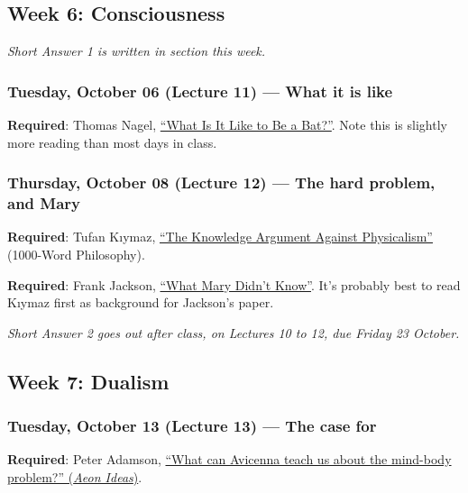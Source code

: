\documentclass[
  letterpaper,
  DIV=11,
  numbers=noendperiod]{scrartcl}
\begin{document}
\subsection{Week 6: Consciousness}\label{week-6-consciousness}

\emph{Short Answer 1 is written in section this week.}

\subsubsection{Tuesday, October 06 (Lecture 11) --- What it is
like}\label{tuesday-october-06-lecture-11-what-it-is-like}

\textbf{Required}: Thomas Nagel,
\href{https://rintintin.colorado.edu/~vancecd/phil201/Nagel.pdf}{``What
Is It Like to Be a Bat?''}. Note this is slightly more reading than most
days in class.

\subsubsection{Thursday, October 08 (Lecture 12) --- The hard problem,
and
Mary}\label{thursday-october-08-lecture-12-the-hard-problem-and-mary}

\textbf{Required}: Tufan Kıymaz,
\href{https://1000wordphilosophy.com/2019/10/05/the-knowledge-argument-against-physicalism/}{``The
Knowledge Argument Against Physicalism''} (1000-Word Philosophy).

\textbf{Required}: Frank Jackson,
\href{https://courses.physics.illinois.edu/phys419/sp2021/Jackson1986_WhatMaryDidntKnow.pdf}{``What
Mary Didn't Know''}. It's probably best to read Kıymaz first as
background for Jackson's paper.

\emph{Short Answer 2 goes out after class, on Lectures 10 to 12, due
Friday 23 October.}

\subsection{Week 7: Dualism}\label{week-7-dualism}

\subsubsection{Tuesday, October 13 (Lecture 13) --- The case
for}\label{tuesday-october-13-lecture-13-the-case-for}

\textbf{Required}: Peter Adamson,
\href{https://aeon.co/ideas/what-can-avicenna-teach-us-about-the-mind-body-problem}{``What
can Avicenna teach us about the mind-body problem?'' (\emph{Aeon
Ideas})}.
\end{document}
